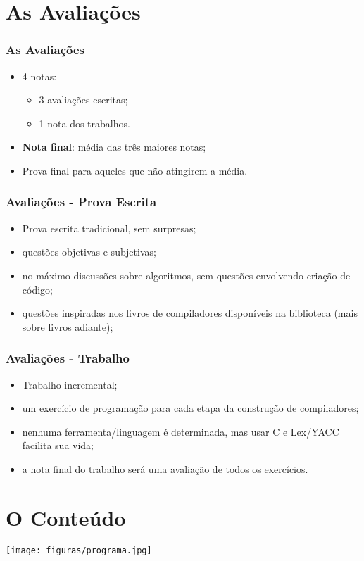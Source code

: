 \documentclass[table]{beamer}
\begin{document}
\section{As Avaliações}
\begin{frame}
   \frametitle{As Avaliações}
   \begin{itemize}
      \item 4 notas:
      \begin{itemize}
         \item 3 avaliações escritas;
	      \item 1 nota dos trabalhos.
      \end{itemize}
      \item \textbf{Nota final}: média das três maiores notas;
      \item Prova final para aqueles que não atingirem a média. 
   \end{itemize}
\end{frame}

\begin{frame}
   \frametitle{Avaliações - Prova Escrita}
   \begin{itemize}
      \item Prova escrita tradicional, sem surpresas;
      \item questões objetivas e subjetivas;
      \item no máximo discussões sobre algoritmos, sem questões envolvendo criação de código;
      \item questões inspiradas nos livros de compiladores disponíveis na biblioteca (mais sobre livros adiante);
   \end{itemize}
\end{frame}

\begin{frame}
   \frametitle{Avaliações - Trabalho}
   \begin{itemize}
      \item Trabalho incremental;
      \item um exercício de programação para cada etapa da construção de compiladores;
      \item nenhuma ferramenta/linguagem é determinada, mas usar C e Lex/YACC facilita sua vida;
      \item a nota final do trabalho será uma avaliação de todos os exercícios.
   \end{itemize}
\end{frame}

\section{O Conteúdo}
\begin{frame}
   \texttt{[image: figuras/programa.jpg]}
\end{frame}
\end{document}
